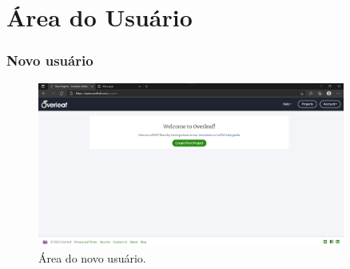 \documentclass{beamer}
\begin{document}
    \section{Área do Usuário}
    \begin{frame}
        \frametitle{Novo usuário}
    \begin{figure}
        \centering
        \caption{Área do novo usuário.}
        \label{fig:newUserOverleaf}
        \includegraphics[width=0.9\textwidth]{../images/newUserOverleaf.png}
    \end{figure}
    \end{frame}
\end{document}
